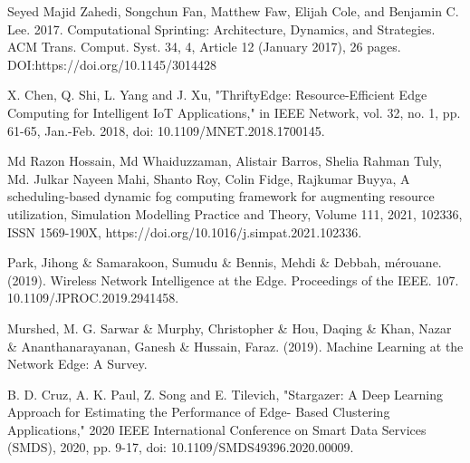 \documentclass[runningheads]{llncs}
\begin{document}
\begin{thebibliography}{8}
Seyed Majid Zahedi, Songchun Fan, Matthew Faw, Elijah Cole, and Benjamin C. Lee. 2017. Computational Sprinting: Architecture, Dynamics, and Strategies. ACM Trans. Comput. Syst. 34, 4, Article 12 (January 2017), 26 pages. DOI:https://doi.org/10.1145/3014428


X. Chen, Q. Shi, L. Yang and J. Xu, "ThriftyEdge: Resource-Efficient Edge Computing for Intelligent IoT Applications," in IEEE Network, vol. 32, no. 1, pp. 61-65, Jan.-Feb. 2018, doi: 10.1109/MNET.2018.1700145.


Md Razon Hossain, Md Whaiduzzaman, Alistair Barros, Shelia Rahman Tuly, Md. Julkar Nayeen Mahi, Shanto Roy, Colin Fidge, Rajkumar Buyya,
A scheduling-based dynamic fog computing framework for augmenting resource utilization,
Simulation Modelling Practice and Theory,
Volume 111, 2021, 102336, ISSN 1569-190X,
https://doi.org/10.1016/j.simpat.2021.102336.


Park, Jihong \& Samarakoon, Sumudu \& Bennis, Mehdi \& Debbah, mérouane. (2019). Wireless Network Intelligence at the Edge. Proceedings of the IEEE. 107. 10.1109/JPROC.2019.2941458. 


Murshed, M. G. Sarwar \& Murphy, Christopher \& Hou, Daqing \& Khan, Nazar \& Ananthanarayanan, Ganesh \& Hussain, Faraz. (2019). Machine Learning at the Network Edge: A Survey. 


B. D. Cruz, A. K. Paul, Z. Song and E. Tilevich, "Stargazer: A Deep Learning Approach for Estimating the Performance of Edge- Based Clustering Applications," 2020 IEEE International Conference on Smart Data Services (SMDS), 2020, pp. 9-17, doi: 10.1109/SMDS49396.2020.00009.



\end{thebibliography}
\end{document}

